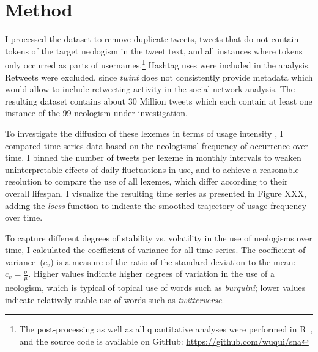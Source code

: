 \documentclass[
  a4paper,
  abstract=on,
  captions=tableabove,
  ]{scrartcl}
\newcommand{\ol}[1]{\emph{#1}}
\begin{document}
\section{Method}
  \label{sec:method}

  I processed the dataset to remove duplicate tweets, tweets that do not contain tokens of the target neologism in the tweet text, and all instances where tokens only occurred as parts of usernames.\footnote{The post-processing as well as all quantitative analyses were performed in R~\parencite{RCoreTeam2018LanguageEnvironment}, and the source code is available on GitHub: \url{https://github.com/wuqui/sna}} Hashtag uses were included in the analysis. Retweets were excluded, since \emph{twint} does not consistently provide metadata which would allow to include retweeting activity in the social network analysis. The resulting dataset contains about 30 Million tweets which each contain at least one instance of the 99 neologism under investigation.

  To investigate the diffusion of these lexemes in terms of usage intensity \parencite{Stefanowitsch2017CorpusbasedPerspective}, I compared time-series data based on the neologisms' frequency of occurrence over time. I binned the number of tweets per lexeme in monthly intervals to weaken uninterpretable effects of daily fluctuations in use, and to achieve a reasonable resolution to compare the use of all lexemes, which differ according to their overall lifespan. I visualize the resulting time series as presented in Figure XXX, adding the \emph{loess} function to indicate the smoothed trajectory of usage frequency over time.

  To capture different degrees of stability vs. volatility in the use of neologisms over time, I calculated the coefficient of variance for all time series. The coefficient of variance~($c_{v}$) is a measure of the ratio of the standard deviation to the mean: $c_{v} = \frac{\sigma}{\mu}$. Higher values indicate higher degrees of variation in the use of a neologism, which is typical of topical use of words such as \ol{burquini}; lower values indicate relatively stable use of words such as \ol{twitterverse}.
\end{document}
